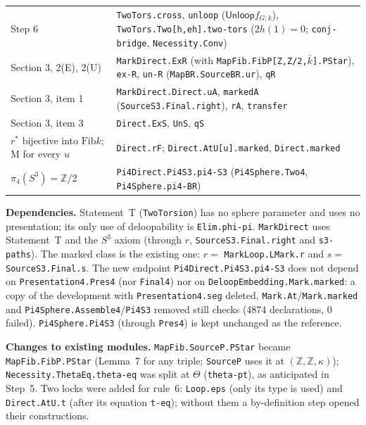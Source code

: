 \documentclass[11pt]{amsart}
\theoremstyle{definition}
\theoremstyle{remark}
\newcommand{\code}[1]{\texttt{#1}}
\newcommand{\Fib}{\mathrm{Fib}}
\newcommand{\Unloop}{\mathsf{Unloop}}
\newcommand{\Z}{\mathbb{Z}}
\begin{document}
\begin{tabular}{@{}>{\raggedright\arraybackslash}p{}>{\raggedright\arraybackslash}p{}@{}}
Step 6 & \code{TwoTors.cross}, \code{unloop} ($\Unloop f_{G;k}$), \code{TwoTors.Two[h,eh].two-tors} ($2h(1)=0$; \code{conj-bridge}, \code{Necessity.Conv})\\
Section 3, 2(E), 2(U) & \code{MarkDirect.ExR} (with \code{MapFib.FibP[Z,Z/2,$\bar k$].PStar}), \code{ex-R}, \code{un-R} (\code{MapBR.SourceBR.ur}), \code{qR}\\
Section 3, item 1 & \code{MarkDirect.Direct.uA}, \code{markedA} (\code{SourceS3.Final.right}), \code{rA}, \code{transfer}\\
Section 3, item 3 & \code{Direct.ExS}, \code{UnS}, \code{qS}\\
$r^*$ bijective into $\Fib k$; M for every $u$ & \code{Direct.rF}; \code{Direct.AtU[u].marked}, \code{Direct.marked}\\
$\pi_4(S^3)=\Z/2$ & \code{Pi4Direct.Pi4S3.pi4-S3} (\code{Pi4Sphere.Two4}, \code{Pi4Sphere.pi4-BR})
\end{tabular}

\smallskip
\noindent\textbf{Dependencies.} Statement~T (\code{TwoTorsion}) has no sphere
parameter and uses no presentation; its only use of deloopability is
\code{Elim.phi-pi}. \code{MarkDirect} uses Statement~T and the $S^3$ axiom
(through $r$, \code{SourceS3.Final.right} and \code{s3-paths}). The marked class
is the existing one: $r=$ \code{MarkLoop.LMark.r} and $s=$
\code{SourceS3.Final.s}. The new endpoint \code{Pi4Direct.Pi4S3.pi4-S3} does
not depend on \code{Presentation4.Pres4} (nor \code{Final4}) nor on
\code{DeloopEmbedding.Mark.marked}: a copy of the development with
\code{Presentation4.seg} deleted, \code{Mark.At}/\code{Mark.marked} and
\code{Pi4Sphere.Assemble4}/\code{Pi4S3} removed still checks (4874
declarations, 0 failed). \code{Pi4Sphere.Pi4S3} (through \code{Pres4}) is kept
unchanged as the reference.

\noindent\textbf{Changes to existing modules.} \code{MapFib.SourceP.PStar} became
\code{MapFib.FibP.PStar} (Lemma~7 for any triple; \code{SourceP} uses it at
$(\Z,\Z,\kappa)$); \code{Necessity.ThetaEq.theta-eq} was split at $\Theta$
(\code{theta-pt}), as anticipated in Step~5. Two locks were added for rule~6:
\code{Loop.eps} (only its type is used) and \code{Direct.AtU.t} (after its
equation \code{t-eq}); without them a by-definition step opened their
constructions.
\end{document}
